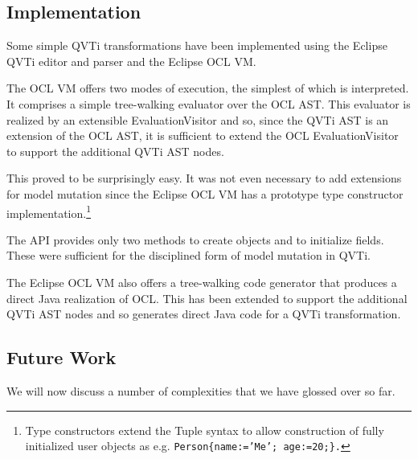 





\subsection{Implementation}
Some simple QVTi transformations have been implemented using the Eclipse QVTi editor and parser and the Eclipse OCL VM\cite{Willink2012}.

The OCL VM offers two modes of execution, the simplest of which is interpreted. It comprises a simple tree-walking evaluator over the OCL AST. This evaluator is realized by an extensible EvaluationVisitor and so, since the QVTi AST is an extension of the OCL AST, it is sufficient to extend the OCL EvaluationVisitor to support the additional QVTi AST nodes.

This proved to be surprisingly easy. It was not even necessary to add extensions for model mutation since the Eclipse OCL VM has a prototype type constructor implementation.\footnote{Type constructors extend the Tuple syntax to allow construction of fully initialized user objects as e.g. \texttt{Person\{name:='Me'; age:=20;\}.}
}

The API provides only two methods to create objects and to initialize fields. These were sufficient for the disciplined form of model mutation in QVTi. 

The Eclipse OCL VM also offers a tree-walking code generator that produces a direct Java realization of OCL. This has been extended to support the additional QVTi AST nodes and so generates direct Java code for a QVTi transformation. 

\subsection{Future Work}\label{Future Work}

We will now discuss a number of complexities that we have glossed over so far.

